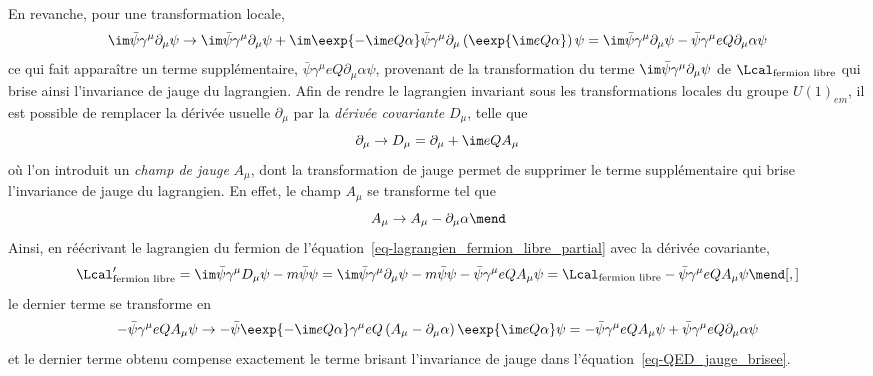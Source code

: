 \par En revanche, pour une transformation locale, %
\begin{equation}
\im\bar{\psi} \gamma^\mu\partial_\mu \psi
\to
\im\bar{\psi} \gamma^\mu\partial_\mu \psi
+
\im\eexp{-\im eQ\alpha}
\bar{\psi}
\gamma^\mu
\partial_\mu
\left(\eexp{\im eQ\alpha}\vphantom{\psi\eexp{\im eQ\alpha}}\right)
\psi
=
\im\bar{\psi} \gamma^\mu\partial_\mu \psi
-
\bar{\psi}
\gamma^\mu
eQ\partial_\mu
\alpha
\psi
\label{eq-QED_jauge_brisee}
\end{equation}
ce qui fait apparaître un terme supplémentaire, $\bar{\psi}\gamma^\mu eQ\partial_\mu\alpha\psi$, provenant de la transformation du terme $\im \bar{\psi} \gamma^\mu\partial_\mu \psi$ de $\Lcal_{\text{fermion libre}}$ qui brise ainsi l'invariance de jauge du lagrangien.
Afin de rendre le lagrangien invariant sous les transformations locales du groupe $U(1)_{em}$, il est possible de remplacer la dérivée usuelle $\partial_\mu$ par la \emph{dérivée covariante} $D_\mu$, telle que
\begin{equation}
\partial_\mu \to D_\mu = \partial_\mu + \im eQ A_\mu
\end{equation}
où l'on introduit un \emph{champ de jauge} $A_\mu$, dont la transformation de jauge permet de supprimer le terme supplémentaire qui brise l'invariance de jauge du lagrangien. En effet, le champ $A_\mu$ se transforme tel que
\begin{equation}
A_\mu \to A_\mu - \partial_\mu\alpha
\mend
\end{equation}
Ainsi, en réécrivant le lagrangien du fermion de l'équation~\eqref{eq-lagrangien_fermion_libre_partial} avec la dérivée covariante,
\begin{equation}
\Lcal_{\text{fermion libre}}' = \im \bar{\psi} \gamma^\mu D_\mu \psi - m \bar{\psi}\psi
= \im \bar{\psi} \gamma^\mu\partial_\mu \psi - m \bar{\psi}\psi - \bar{\psi}\gamma^\mu eQA_\mu \psi
= \Lcal_{\text{fermion libre}} - \bar{\psi}\gamma^\mu eQA_\mu \psi
\mend[,]
\end{equation}
le dernier terme se transforme en
\begin{equation}
-\bar{\psi}\gamma^\mu eQA_\mu \psi
\to
-\bar{\psi}\eexp{-\im eQ\alpha}
\gamma^\mu
eQ\left(A_\mu - \partial_\mu\alpha\right)
\eexp{\im eQ\alpha}\psi
=
-\bar{\psi} \gamma^\mu eQA_\mu \psi
+
\bar{\psi} \gamma^\mu eQ \partial_\mu\alpha \psi
\end{equation}
et le dernier terme obtenu compense exactement le terme brisant l'invariance de jauge dans l'équation~\eqref{eq-QED_jauge_brisee}.
